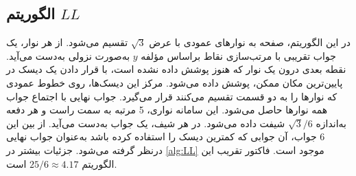\documentclass[12pt]{article}
\begin{document}
\subsection{
الگوریتم $LL$
}

در این الگوریتم، صفحه به نوار‌های عمودی با عرض $\sqrt{3}$ تقسیم می‌شود. از هر نوار، یک جواب تقریبی با مرتب‌سازی نقاط براساس مؤلفه $y$ به‌صورت نزولی به‌دست می‌آید. نقطه بعدی درون یک نوار که هنوز پوشش داده نشده است، با قرار دادن یک دیسک در پایین‌ترین مکان ممکن، پوشش داده می‌شود. مرکز این دیسک‌ها، روی خطوط عمودی که نوارها را به دو قسمت تقسیم می‌کنند قرار می‌گیرد. جواب نهایی با اجتماع جوا‌ب همه نوارها حاصل می‌شود. این سامانه نواری، 5 مرتبه به سمت راست و هر دفعه به‌اندازه $\sqrt{3} / 6$ شیفت داده می‌شود. در هر شیف، یک جواب به‌دست می‌آید. از بین این 6 جواب، آن جوابی که کمترین دیسک را استفاده کرده باشد به‌عنوان جواب نهایی درنظر گرفته می‌شود. جزئیات بیشتر در
\cref{alg:LL}
موجود است. فاکتور تقریب این الگوریتم $25/6 \approx 4.17$ است.
\end{document}
